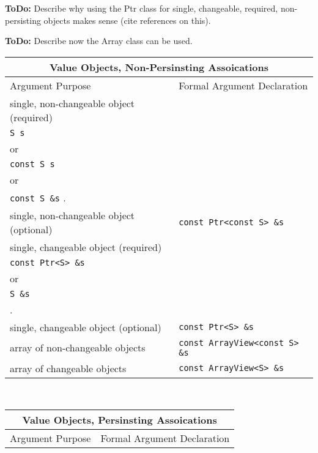 {}\textbf{ToDo:} Describe why using the Ptr class for single, changeable,
required, non-persisting objects makes sense (cite references on this).

{}\textbf{ToDo:} Describe now the Array class can be used.


\begin{table}[p]
%
\begin{center}
%
%
\begin{tabular}{|l|l|}
%
\multicolumn{2}{c}{\textbf{Value Objects, Non-Persinsting Assoications}} \\
%
\hline
Argument Purpose
& Formal Argument Declaration \\
\hline
\hline
single, non-changeable object (required)
& \begin{minipage}{12ex}
    {\tiny .}\\
    {}\texttt{S s} \\
    or \\
    {}\texttt{const S s} \\
    or \\
    {}\texttt{const S \&s}
    {\tiny .}
  \end{minipage} \\
\hline
single, non-changeable object (optional)
& {}\texttt{const Ptr<const S> \&s} \\
\hline
single, changeable object (required)
& \begin{minipage}{20ex}
    {\tiny .}\\
    {}\texttt{const Ptr<S> \&s} \\
    or \\
    {}\texttt{S \&s} \\
    {\tiny .}
  \end{minipage} \\
\hline
single, changeable object (optional)
& \texttt{const Ptr<S> \&s} \\
\hline
array of non-changeable objects
& {}\texttt{const ArrayView<const S> \&s} \\
\hline
array of changeable objects
& {}\texttt{const ArrayView<S> \&s} \\
\hline
%
\end{tabular} \\[3ex]
%
\begin{tabular}{|l|l|}
%
\multicolumn{2}{c}{\textbf{Value Objects, Persinsting Assoications}} \\
%
\hline
Argument Purpose
& Formal Argument Declaration \\

\end{tabular}
\end{center}
\end{table}

